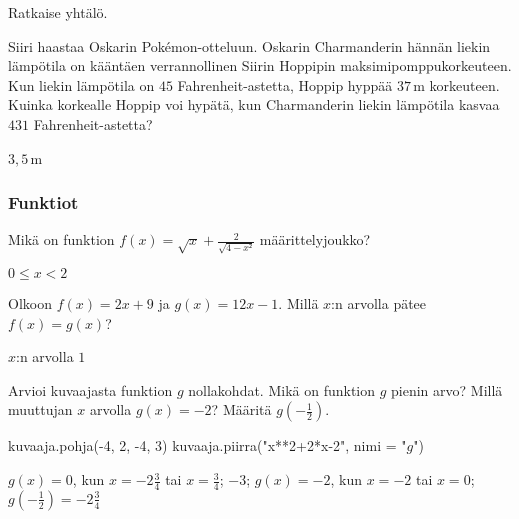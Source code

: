 \begin{tehtava}
	Ratkaise yhtälö.
	
\begin{vastaus}
\end{vastaus}
\end{tehtava}

\begin{tehtava}
	Siiri haastaa Oskarin Pokémon-otteluun. Oskarin Charmanderin hännän liekin lämpötila on kääntäen verrannollinen Siirin Hoppipin maksimipomppukorkeuteen. Kun liekin lämpötila on $45$ Fahrenheit-astetta, Hoppip hyppää $37$\,m korkeuteen. Kuinka korkealle Hoppip voi hypätä, kun Charmanderin liekin lämpötila kasvaa $431$ Fahrenheit-astetta? %
	
	\begin{vastaus}
	$3,5$\,m
	\end{vastaus}
\end{tehtava}

\subsubsection*{Funktiot}

\begin{tehtava}
	Mikä on funktion $f(x)=\sqrt{x}+\frac{2}{\sqrt{4-x²}}$ määrittelyjoukko?
\begin{vastaus}
	{$0\leq x<2$}
		
\end{vastaus}
\end{tehtava}

\begin{tehtava}
	Olkoon $f(x)=2x+9$ ja $g(x)=12x-1$. Millä $x$:n arvolla pätee $f(x)=g(x)$? 

\begin{vastaus}
$x$:n arvolla $1$
		
\end{vastaus}
\end{tehtava}

\begin{tehtava}
Arvioi kuvaajasta funktion $g$ nollakohdat. Mikä on funktion $g$ pienin arvo? Millä muuttujan $x$ arvolla $g(x)=-2$? Määritä $g\left(-\frac{1}{2}\right)$.
\begin{kuva}
    kuvaaja.pohja(-4, 2, -4, 3)
    kuvaaja.piirra("x**2+2*x-2", nimi = "$g$")
\end{kuva}

\begin{vastaus}
	$g(x)=0$, kun $x=-2\frac{3}{4}$ tai $x=\frac{3}{4}$; $-3$; $g(x)=-2$, kun $x=-2$ tai $x=0$; $g\left(-\frac{1}{2}\right)=-2\frac{3}{4}$
		
\end{vastaus}
\end{tehtava}

